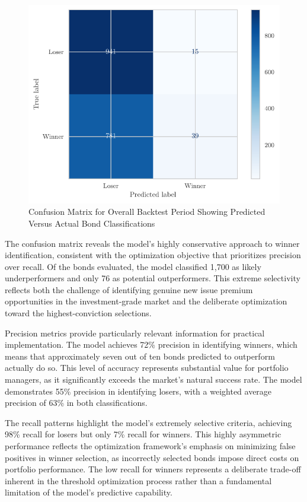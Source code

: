 \begin{figure}[h]
    \begin{center}
        \includegraphics[width=\textwidth]{images/confusion_matrix.pdf}
    \end{center}
    \caption{Confusion Matrix for Overall Backtest Period Showing Predicted Versus Actual Bond Classifications}
    \label{fig:confusion_matrix}
\end{figure}

The confusion matrix reveals the model's highly conservative approach to winner identification, consistent with the optimization objective that prioritizes precision over recall. Of the bonds evaluated, the model classified 1,700 as likely underperformers and only 76 as potential outperformers. This extreme selectivity reflects both the challenge of identifying genuine new issue premium opportunities in the investment-grade market and the deliberate optimization toward the highest-conviction selections.

Precision metrics provide particularly relevant information for practical implementation. The model achieves 72\% precision in identifying winners, which means that approximately seven out of ten bonds predicted to outperform actually do so. This level of accuracy represents substantial value for portfolio managers, as it significantly exceeds the market's natural success rate. The model demonstrates 55\% precision in identifying losers, with a weighted average precision of 63\% in both classifications.

The recall patterns highlight the model's extremely selective criteria, achieving 98\% recall for losers but only 7\% recall for winners. This highly asymmetric performance reflects the optimization framework's emphasis on minimizing false positives in winner selection, as incorrectly selected bonds impose direct costs on portfolio performance. The low recall for winners represents a deliberate trade-off inherent in the threshold optimization process rather than a fundamental limitation of the model's predictive capability.

